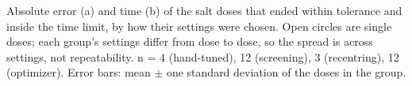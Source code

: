  Absolute error (a) and time (b) of the salt doses that ended within tolerance and inside the time limit, by how their settings were chosen. Open circles are single doses; each group's settings differ from dose to dose, so the spread is across settings, not repeatability. n = 4 (hand-tuned), 12 (screening), 3 (recentring), 12 (optimizer). Error bars: mean $\pm$ one standard deviation of the doses in the group.

